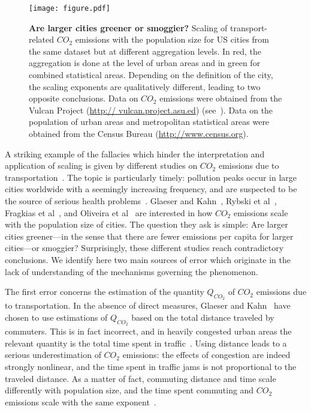 \begin{figure}[!h]
	\centering
	\texttt{[image: figure.pdf]}
	\caption{ {\bf Are larger cities greener or smoggier?} Scaling of transport-related $CO_2$
emissions with the population size for US cities from the same dataset but at different aggregation
levels. In red, the aggregation is done at the level of urban areas and in green for combined statistical
areas. Depending on the definition of the city, the scaling exponents are qualitatively different, leading
to two opposite conclusions. Data on $CO_2$ emissions were obtained from the Vulcan Project (\url{http://
vulcan.project.asu.ed}) (see~\cite{Fragkias:2013,Oliveira:2014}). Data on the population of urban areas and
metropolitan statistical areas were obtained from the Census Bureau (\protect\url{http://www.census.org}). \label{fig}}
\end{figure}


A striking example of the fallacies which hinder the interpretation and application
of scaling is given by different studies on $CO_2$ emissions due to transportation~\cite{Fragkias:2013,Glaeser:2010,Oliveira:2014,Rybski:2013}. The topic
is particularly timely: pollution peaks occur in large cities worldwide with a seemingly
increasing frequency, and are suspected to be the source of serious health problems~\cite{Bernstein:2004}. Glaeser and Kahn~\cite{Glaeser:2010}, Rybski et al~\cite{Rybski:2013}, Fragkias et al~\cite{Fragkias:2013}, and Oliveira et al~\cite{Oliveira:2014} are interested in how $CO_2$ emissions scale with the population size
of cities. The question they ask is simple: Are larger cities greener---in the sense that there
are fewer emissions per capita for larger cities---or smoggier? Surprisingly, these different
studies reach contradictory conclusions. We identify here two main sources of error which
originate in the lack of understanding of the mechanisms governing the phenomenon.

The first error concerns the estimation of the quantity $Q_{CO_2}$ of $CO_2$ emissions due to
transportation. In the absence of direct measures, Glaeser and Kahn~\cite{Glaeser:2010} have chosen
to use estimations of $Q_{CO_2}$ based on the total distance traveled by commuters. This is in fact
incorrect, and in heavily congested urban areas the relevant quantity is the total time spent
in traffic~\cite{Louf:2013}. Using distance leads to a serious underestimation of
$CO_2$ emissions: the effects of congestion are indeed strongly nonlinear, and the time spent
in traffic jams is not proportional to the traveled distance. As a matter of fact, commuting
distance and time scale differently with population size, and the time spent commuting and
$CO_2$ emissions scale with the same exponent~\cite{Louf:2014}.

